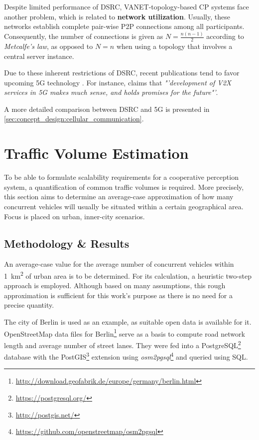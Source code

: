 Despite limited performance of DSRC, VANET-topology-based CP systems face another problem, which is related to \textbf{network utilization}. Usually, these networks establish complete pair-wise P2P connections among all participants. Consequently, the number of connections is given as $N = \frac{n(n-1)}{2 }$ according to \textit{Metcalfe's law}, as opposed to $N = n$ when using a topology that involves a central server instance.

Due to these inherent restrictions of DSRC, recent publications tend to favor upcoming 5G technology \cite{Briegleb2019, 5GAutomotiveAssociation2016}. For instance, \cite{Wevers2017} claims that \textit{"'development of V2X services in 5G makes much sense, and holds promises for the future"'}.

A more detailed comparison between DSRC and 5G is presented in \cref{sec:concept_design:cellular_communication}.

\section{Traffic Volume Estimation}
\label{sec:problem_analysis:traffic_volume_estimation}

To be able to formulate scalability requirements for a cooperative perception system, a quantification of common traffic volumes is required. More precisely, this section aims to determine an average-case approximation of how many concurrent vehicles will usually be situated within a certain geographical area. Focus is placed on urban, inner-city scenarios. 

\subsection{Methodology \& Results}
\label{subsec:problem_analysis:methodology_results}
An average-case value for the average number of concurrent vehicles within \SI{1}{\square\kilo\meter} of urban area is to be determined. For its calculation, a heuristic two-step approach is employed. Although based on many assumptions, this rough approximation is sufficient for this work's purpose as there is no need for a precise quantity. 

The city of Berlin is used as an example, as suitable open data is available for it. OpenStreetMap data files for Berlin\footnote{\url{http://download.geofabrik.de/europe/germany/berlin.html}} serve as a basis to compute road network length and average number of street lanes. They were fed into a PostgreSQL\footnote{\url{https://postgresql.org/}} database with the PostGIS\footnote{\url{http://postgis.net/}} extension using \textit{osm2pgsql}\footnote{\url{https://github.com/openstreetmap/osm2pgsql}} and queried using SQL.

